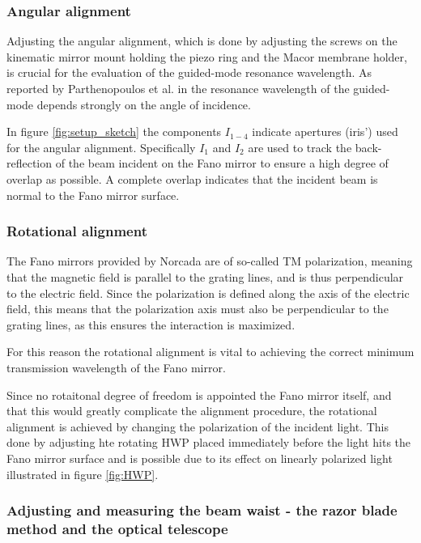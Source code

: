 \subsubsection*{Angular alignment}
Adjusting the angular alignment, which is done by adjusting the screws on the kinematic mirror mount holding the piezo ring and the Macor membrane holder, is crucial for the evaluation of the guided-mode resonance wavelength. As reported by Parthenopoulos et al. in \cite{Parthenopoulos} the resonance wavelength of the guided-mode depends strongly on the angle of incidence. 

In figure \ref{fig:setup_sketch} the components $I_{1-4}$ indicate apertures (iris') used for the angular alignment. Specifically $I_1$ and $I_2$ are used to track the back-reflection of the beam incident on the Fano mirror to ensure a high degree of overlap as possible. A complete overlap indicates that the incident beam is normal to the Fano mirror surface. 

\subsubsection*{Rotational alignment}
The Fano mirrors provided by Norcada are of so-called TM polarization, meaning that the magnetic field is parallel to the grating lines, and is thus perpendicular to the electric field. Since the polarization is defined along the axis of the electric field, this means that the polarization axis must also be perpendicular to the grating lines, as this ensures the interaction is maximized\cite{Sadov}.

For this reason the rotational alignment is vital to achieving the correct minimum transmission wavelength of the Fano mirror. 

Since no rotaitonal degree of freedom is appointed the Fano mirror itself, and that this would greatly complicate the alignment procedure, the rotational alignment is achieved by changing the polarization of the incident light. This done by adjusting hte rotating HWP placed immediately before the light hits the Fano mirror surface and is possible due to its effect on linearly polarized light illustrated in figure \ref{fig:HWP}.

\subsubsection{Adjusting and measuring the beam waist - the razor blade method and the optical telescope}\label{sec:beam_waist}

